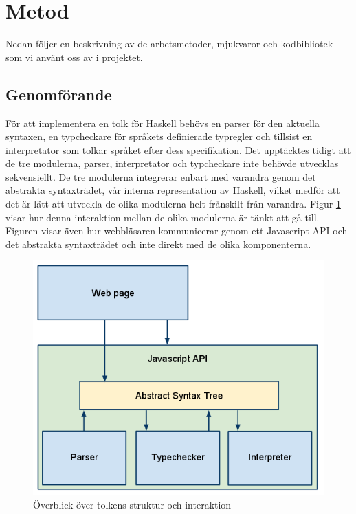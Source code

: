 \section{Metod} 

Nedan följer en beskrivning av de arbetsmetoder, mjukvaror och kodbibliotek som vi använt oss av i projektet. 

\subsection{Genomförande}

För att implementera en tolk för Haskell behövs en parser för den aktuella syntaxen, en typcheckare för språkets definierade typregler och tillsist en interpretator som tolkar språket efter dess specifikation.
Det upptäcktes tidigt att de tre modulerna, parser, interpretator och typcheckare inte behövde utvecklas sekvensiellt. De tre modulerna integrerar enbart med varandra genom det abstrakta syntaxträdet, vår interna representation av Haskell, vilket medför att det är lätt att utveckla de olika modulerna helt frånskilt från varandra. Figur \ref{fig:tolkens_struktur} visar hur denna interaktion mellan de olika modulerna är tänkt att gå till. Figuren visar även hur webbläsaren kommunicerar genom ett Javascript API och det abstrakta syntaxträdet och inte direkt med de olika komponenterna. 

\begin{figure}[h]
    \begin{center}
        \includegraphics[width=1.0\textwidth]{image1.png}
        \caption{Överblick över tolkens struktur och interaktion}
        \label{fig:tolkens_struktur} %
    \end{center}
\end{figure}

